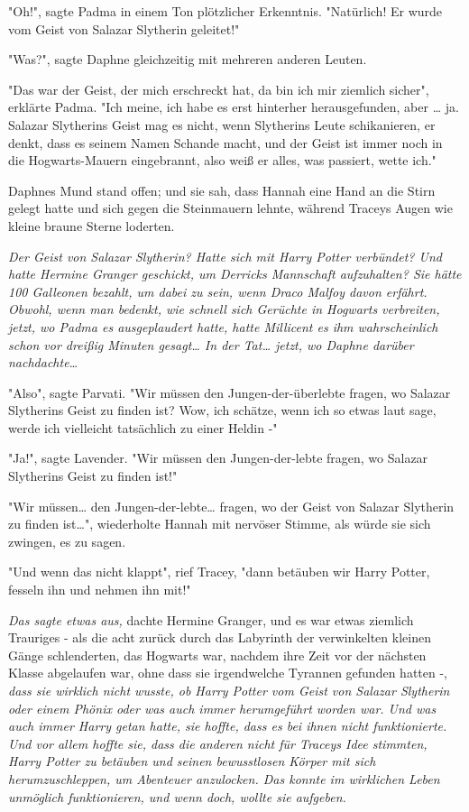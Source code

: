 {"Oh!", sagte Padma in einem Ton plötzlicher Erkenntnis. "Natürlich! Er wurde vom Geist von Salazar Slytherin geleitet!"

"Was?", sagte Daphne gleichzeitig mit mehreren anderen Leuten.

"Das war der Geist, der mich erschreckt hat, da bin ich mir ziemlich sicher", erklärte Padma. "Ich meine, ich habe es erst hinterher herausgefunden, aber … ja. Salazar Slytherins Geist mag es nicht, wenn Slytherins Leute schikanieren, er denkt, dass es seinem Namen Schande macht, und der Geist ist immer noch in die Hogwarts-Mauern eingebrannt, also weiß er alles, was passiert, wette ich."

Daphnes Mund stand offen; und sie sah, dass Hannah eine Hand an die Stirn gelegt hatte und sich gegen die Steinmauern lehnte, während Traceys Augen wie kleine braune Sterne loderten.

\emph{Der Geist von Salazar Slytherin? Hatte sich mit Harry Potter verbündet? Und hatte Hermine Granger geschickt, um Derricks Mannschaft aufzuhalten? Sie hätte 100 Galleonen bezahlt, um dabei zu sein, wenn Draco Malfoy davon erfährt. Obwohl, wenn man bedenkt, wie schnell sich Gerüchte in Hogwarts verbreiten, jetzt, wo Padma es ausgeplaudert hatte, hatte Millicent es ihm wahrscheinlich schon vor dreißig Minuten gesagt… In der Tat… jetzt, wo Daphne darüber nachdachte…}

"Also", sagte Parvati. "Wir müssen den Jungen-der-überlebte fragen, wo Salazar Slytherins Geist zu finden ist? Wow, ich schätze, wenn ich so etwas laut sage, werde ich vielleicht tatsächlich zu einer Heldin -"

"Ja!", sagte Lavender. "Wir müssen den Jungen-der-lebte fragen, wo Salazar Slytherins Geist zu finden ist!"

"Wir müssen… den Jungen-der-lebte… fragen, wo der Geist von Salazar Slytherin zu finden ist…", wiederholte Hannah mit nervöser Stimme, als würde sie sich zwingen, es zu sagen.

"Und wenn das nicht klappt", rief Tracey, "dann betäuben wir Harry Potter, fesseln ihn und nehmen ihn mit!"

\emph{Das sagte etwas aus,} dachte Hermine Granger, und es war etwas ziemlich Trauriges - als die acht zurück durch das Labyrinth der verwinkelten kleinen Gänge schlenderten, das Hogwarts war, nachdem ihre Zeit vor der nächsten Klasse abgelaufen war, ohne dass sie irgendwelche Tyrannen gefunden hatten -, \emph{dass sie wirklich nicht wusste, ob Harry Potter vom Geist von Salazar Slytherin oder einem Phönix oder was auch immer herumgeführt worden war. Und was auch immer Harry getan hatte, sie hoffte, dass es bei ihnen nicht funktionierte. Und vor allem hoffte sie, dass die anderen nicht für Traceys Idee stimmten, Harry Potter zu betäuben und seinen bewusstlosen Körper mit sich herumzuschleppen, um Abenteuer anzulocken. Das konnte im wirklichen Leben unmöglich funktionieren, und wenn doch, wollte sie aufgeben.}

}

